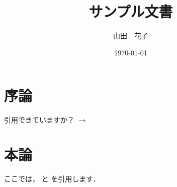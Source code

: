 \documentclass[a4paper]{jlreq}
\begin{document}
\title{\huge サンプル文書}
\author{山田　花子}
\date{\today}
\maketitle

\section{序論}
引用できていますか？ $\to$ \cite{Haxby2425}

\section{本論}
ここでは，\cite{Mitchell1191} と \cite{Haxby2425} を引用します．

\newpage
\printbibliography

\newpage
\appendix

\end{document}
